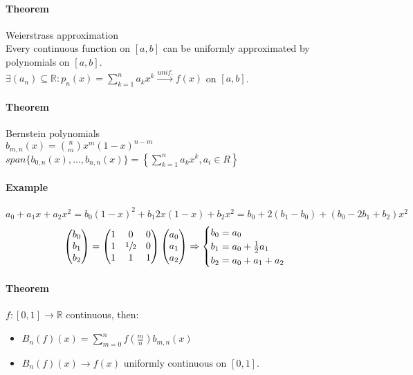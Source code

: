 \documentclass{article}
\newcommand{\DS}{\displaystyle}
\newcommand{\func}[3]{#1 : #2 \rightarrow #3}
\newcommand{\tounif}{\xrightarrow{unif.}}
\newcommand{\sumn}[1]{\sum_{k=1}^n #1}
\newcommand{\intcc}[1]{\left[#1\right]}
\newcommand{\R}{\mathbb{R}}
\newcommand{\vecThree}[3]{\begin{pmatrix}#1 \\ #2 \\ #3\end{pmatrix}}
\newcommand{\Theorem}{\paragraph{Theorem}}
\newcommand{\Example}{\paragraph{Example}}
\begin{document}
	\Theorem Weierstrass approximation
\\Every continuous function on $\intcc{a,b}$ can be uniformly approximated by
	polynomials on $\intcc{a,b}$.
\\$\DS \exists (a_n) \subseteq \R : p_n(x) = \sumn a_k x^k \tounif f(x)$ on
	$\intcc{a,b}$.

	\Theorem Bernstein polynomials
\\$b_{m,n}(x) = \binom{n}{m} x^m (1-x)^{n-m}$
\\$\DS span \{ b_{0,n}(x), \hdots, b_{n,n}(x) \} = \left\{ \sumn a_k x^k, a_i
	\in R \right\}$

	\Example
	\begin{equation*}
		a_0 + a_1x + a_2 x^2 = b_0 (1 - x)^2 + b_1 2x (1-x) + b_2 x^2 =
		b_0 + 2 (b_1 - b_0) + (b_0 - 2b_1 + b_2) x^2
	\end{equation*}
	\begin{equation*}
		\vecThree{b_0}{b_1}{b_2} = \begin{pmatrix}
			1 & 0 & 0 \\
			1 & \sfrac{1}{2} & 0 \\
			1 & 1 & 1
		\end{pmatrix} \vecThree{a_0}{a_1}{a_2} \Rightarrow
		\begin{cases}
			b_0 = a_0 \\
			b_1 = a_0 + \frac{1}{2} a_1 \\
			b_2 = a_0 + a_1 + a_2
		\end{cases}
	\end{equation*}

	\Theorem $\func{f}{\intcc{0,1}}{\R}$ continuous, then:
	\begin{itemize}
		\item $\DS B_n(f)(x) = \sum_{m=0}^{n} f(\frac{m}{n}) b_{m,n}(x)$
		\item $B_n(f)(x) \to f(x)$ uniformly continuous on $\intcc{0,1}$.
	\end{itemize}


\end{document}
